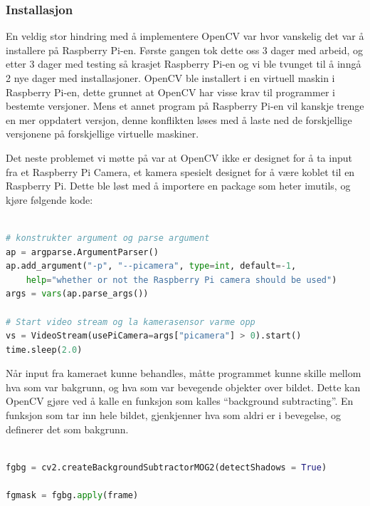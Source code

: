 \documentclass{article}
\begin{document}
\subsubsection{Installasjon}
En veldig stor hindring med å implementere OpenCV var hvor vanskelig det var å installere på Raspberry Pi-en. Første gangen tok dette oss 3 dager med arbeid, og etter 3 dager med testing så krasjet Raspberry Pi-en og vi ble tvunget til å inngå 2 nye dager med installasjoner. OpenCV ble installert i en virtuell maskin i Raspberry Pi-en, dette grunnet at OpenCV har visse krav til programmer i bestemte versjoner. Mens et annet program på Raspberry Pi-en vil kanskje trenge en mer oppdatert versjon, denne konflikten løses med å laste ned de forskjellige versjonene på forskjellige virtuelle maskiner. 

Det neste problemet vi møtte på var at OpenCV ikke er designet for å ta input fra et Raspberry Pi Camera, et kamera spesielt designet for å være koblet til en Raspberry Pi. Dette ble løst med å importere en package som heter imutils, og kjøre følgende kode:
\begin{lstlisting}[language=Python, caption=OpenCV 1]

# konstrukter argument og parse argument
ap = argparse.ArgumentParser()
ap.add_argument("-p", "--picamera", type=int, default=-1,
    help="whether or not the Raspberry Pi camera should be used")
args = vars(ap.parse_args())
 
# Start video stream og la kamerasensor varme opp
vs = VideoStream(usePiCamera=args["picamera"] > 0).start()
time.sleep(2.0)
\end{lstlisting}

Når input fra kameraet kunne behandles, måtte programmet kunne skille mellom hva som var bakgrunn, og hva som var bevegende objekter over bildet. Dette kan OpenCV gjøre ved å kalle en funksjon som kalles “background subtracting”. En funksjon som tar inn hele bildet, gjenkjenner hva som aldri er i bevegelse, og definerer det som bakgrunn.

\begin{lstlisting}[language=Python, caption=OpenCV 2]

fgbg = cv2.createBackgroundSubtractorMOG2(detectShadows = True)

fgmask = fgbg.apply(frame)
\end{lstlisting}
\end{document}
